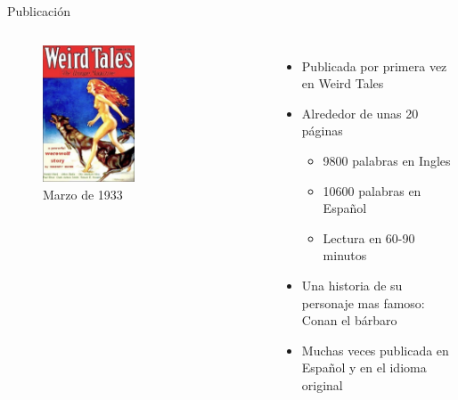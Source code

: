 \begin{frame}{Publicación}
\begin{columns}
    \begin{figure}[htb]
    \centering
        \includegraphics[width=0.5\textwidth]{img/WeirdTales-1933-03}
        \caption{Marzo de 1933}
    \end{figure}
    \begin{itemize}
         \item Publicada por primera vez en Weird Tales
         \item Alrededor de unas 20 páginas
         \begin{itemize}
            \item 9800 palabras en Ingles
            \item 10600 palabras en Español
            \item Lectura en 60-90 minutos
         \end{itemize}
         \item Una historia de su personaje mas famoso: Conan el bárbaro
         \item Muchas veces publicada en Español y en el idioma original
    \end{itemize}
\end{columns}
\end{frame}

